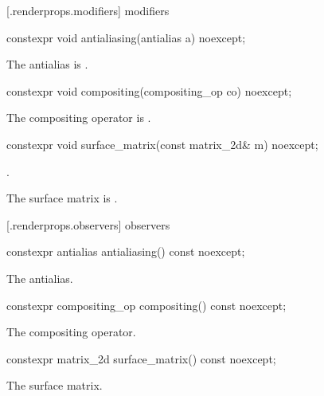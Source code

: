  [\iotwod.renderprops.modifiers] { modifiers}

%
\begin{itemdecl}
constexpr void antialiasing(antialias a) noexcept;
\end{itemdecl}
\begin{itemdescr}
\pnum
\effects
The antialias is .
\end{itemdescr}

%
\begin{itemdecl}
constexpr void compositing(compositing_op co) noexcept;
\end{itemdecl}
\begin{itemdescr}
\pnum
\effects
The compositing operator is .
\end{itemdescr}

%
\begin{itemdecl}
constexpr void surface_matrix(const matrix_2d& m) noexcept;
\end{itemdecl}
\begin{itemdescr}
\pnum
\requires
{}.

\pnum
\effects
The surface matrix is .
\end{itemdescr}

 [\iotwod.renderprops.observers] { observers}

%
\begin{itemdecl}
constexpr antialias antialiasing() const noexcept;
\end{itemdecl}
\begin{itemdescr}
\pnum
\returns
The antialias.
\end{itemdescr}

%
\begin{itemdecl}
constexpr compositing_op compositing() const noexcept;
\end{itemdecl}
\begin{itemdescr}
\pnum
\returns
The compositing operator.
\end{itemdescr}

%
\begin{itemdecl}
constexpr matrix_2d surface_matrix() const noexcept;
\end{itemdecl}
\begin{itemdescr}
\pnum
\returns
The surface matrix.
\end{itemdescr}
